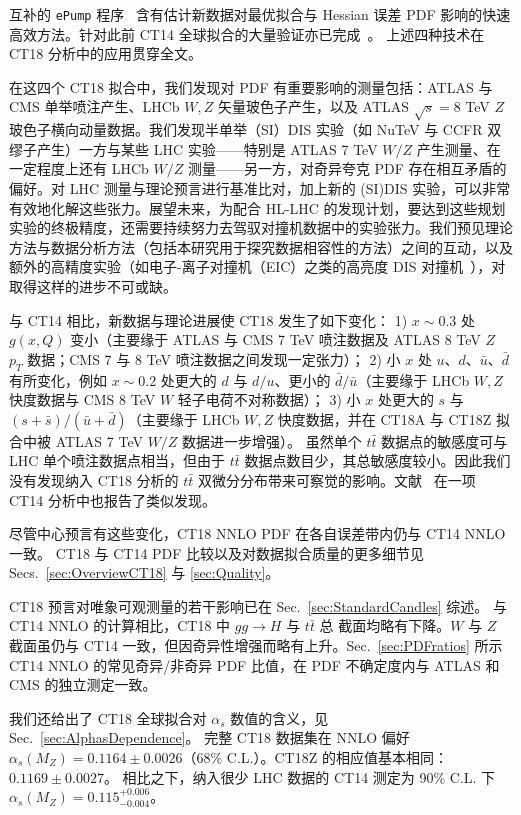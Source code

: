 互补的 \texttt{ePump} 程序~\cite{Schmidt:2018hvu} 含有估计新数据对最优拟合与 Hessian 误差 PDF 影响的快速高效方法。针对此前 CT14 全球拟合的大量验证亦已完成~\cite{Hou:2019gfw}。
上述四种技术在 CT18 分析中的应用贯穿全文。

在这四个 CT18 拟合中，我们发现对 PDF 有重要影响的测量包括：ATLAS 与 CMS 单举喷注产生、LHCb $W,Z$ 矢量玻色子产生，以及 ATLAS $\sqrt{s}=8$ TeV $Z$ 玻色子横向动量数据。我们发现半单举（SI）DIS 实验（如 NuTeV 与 CCFR 双缪子产生）一方与某些 LHC 实验——特别是 ATLAS 7 TeV $W/Z$ 产生测量、在一定程度上还有 LHCb $W/Z$ 测量——另一方，对奇异夸克 PDF 存在相互矛盾的偏好。对 LHC 测量与理论预言进行基准比对，加上新的 (SI)DIS 实验，可以非常有效地化解这些张力。展望未来，为配合 HL-LHC 的发现计划，要达到这些规划实验的终极精度，还需要持续努力去驾驭对撞机数据中的实验张力。我们预见理论方法与数据分析方法（包括本研究用于探究数据相容性的方法）之间的互动，以及额外的高精度实验（如电子-离子对撞机（EIC）之类的高亮度 DIS 对撞机~\cite{Accardi:2012qut}），对取得这样的进步不可或缺。

与 CT14 相比，新数据与理论进展使 CT18 发生了如下变化：
1) $x \sim 0.3$ 处 $g(x,Q)$ 变小（主要缘于 ATLAS 与 CMS 7 TeV 喷注数据及 ATLAS 8 TeV $Z$ $p_T$ 数据；CMS 7 与 8 TeV 喷注数据之间发现一定张力）；
2) 小 $x$ 处 $u$、$d$、$\bar u$、$\bar d$ 有所变化，例如 $x \sim 0.2$ 处更大的 $d$ 与 $d/u$、更小的 $\bar d / \bar u$（主要缘于 LHCb $W,Z$ 快度数据与 CMS 8 TeV $W$ 轻子电荷不对称数据）；
3) 小 $x$ 处更大的 $s$ 与 $(s+\bar s)/(\bar u + \bar d)$（主要缘于 LHCb $W,Z$ 快度数据，并在 CT18A 与 CT18Z 拟合中被 ATLAS 7 TeV $W/Z$ 数据进一步增强）。
虽然单个 $t \bar t$ 数据点的敏感度可与 LHC 单个喷注数据点相当，但由于 $t \bar t$ 数据点数目少，其总敏感度较小。因此我们没有发现纳入 CT18 分析的 $t \bar t$ 双微分分布带来可察觉的影响。文献~\cite{Hou:2019jxd} 在一项 CT14 分析中也报告了类似发现。

尽管中心预言有这些变化，CT18 NNLO PDF 在各自误差带内仍与 CT14 NNLO 一致。
CT18 与 CT14 PDF 比较以及对数据拟合质量的更多细节见 Secs.~\ref{sec:OverviewCT18} 与 \ref{sec:Quality}。

CT18 预言对唯象可观测量的若干影响已在 Sec.~\ref{sec:StandardCandles} 综述。
与 CT14 NNLO 的计算相比，CT18 中 $gg \rightarrow H$ 与 $t\bar t$ 总
截面均略有下降。$W$ 与 $Z$
截面虽仍与 CT14 一致，但因奇异性增强而略有上升。Sec.~\ref{sec:PDFratios} 所示 CT14 NNLO 的常见奇异/非奇异 PDF 比值，在 PDF 不确定度内与 ATLAS 和 CMS 的独立测定一致。

我们还给出了 CT18 全球拟合对 $\alpha_s$ 数值的含义，见 Sec.~\ref{sec:AlphasDependence}。
完整 CT18 数据集在 NNLO 偏好 $\alpha_s(M_Z)\! =\! 0.1164\! \pm\! 0.0026$（68\% C.L.）。CT18Z 的相应值基本相同：$0.1169\pm0.0027$。
相比之下，纳入很少 LHC 数据的 CT14 测定为 90\% C.L. 下 $\alpha_s(M_Z)\! =\! 0.115^{+0.006}_{-0.004}$。

